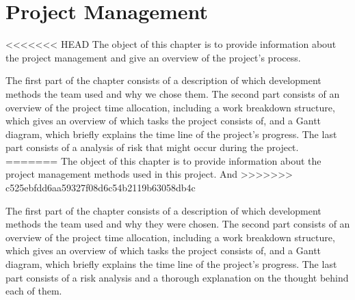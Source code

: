 \chapter{Project Management}
<<<<<<< HEAD
The object of this chapter is to provide information about the project management and give an overview of the project's process. 

The first part of the chapter consists of a description of which development methods the team used and why we chose them. The second part consists of an overview of the project time allocation, including a work breakdown structure, which gives an overview of which tasks the project consists of, and a Gantt diagram, which briefly explains the time line of the project's progress. The last part consists of a analysis of risk that might occur during the project.
=======
The object of this chapter is to provide information about the project management methods used in this project. And  
>>>>>>> c525ebfdd6aa59327f08d6c54b2119b63058db4c

The first part of the chapter consists of a description of which development methods the team used and why they were chosen. The second part consists of an overview of the project time allocation, including a work breakdown structure, which gives an overview of which tasks the project consists of, and a Gantt diagram, which briefly explains the time line of the project's progress. The last part consists of a risk analysis and a thorough explanation on the thought behind each of them.



\newpage



